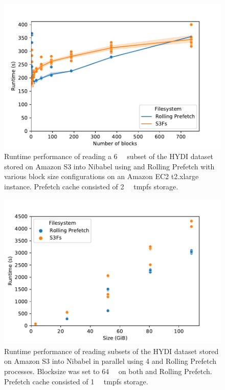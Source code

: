 \begin{figure}
\begin{center}
\includegraphics[width=\columnwidth]{figures/part3-chp1/blocksize.pdf}
\caption{Runtime performance of reading a \SI{6}{\gibi\byte} subset of the HYDI
dataset stored on Amazon S3 into Nibabel using \sfs and Rolling Prefetch with
various block size configurations on an Amazon EC2 t2.xlarge instance. Prefetch
cache consisted of  \SI{2}{\gibi\byte} tmpfs storage.}
\label{fig:blocksize}
\end{center}
\end{figure}

\begin{figure}
\begin{center}
\includegraphics[width=\columnwidth]{figures/part3-chp1/parallel.pdf}
\caption{Runtime performance of reading subsets of the HYDI dataset stored on
Amazon S3 into Nibabel in parallel using 4 \sfs and Rolling Prefetch processes.
Blocksize was set to \SI{64}{\mebi\byte} on both \sfs and Rolling Prefetch.
Prefetch cache consisted of \SI{1}{\gibi\byte} tmpfs storage.}
\label{fig:parallel}
\end{center}
\end{figure}



